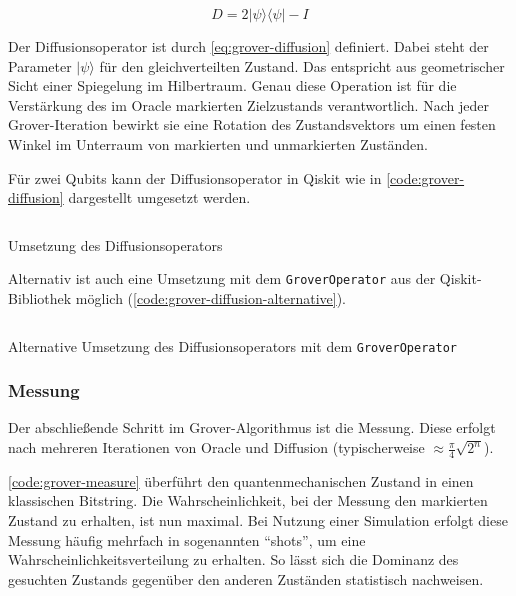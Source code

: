 \begin{equation}
\label{eq:grover-diffusion}
D = 2|\psi\rangle\langle\psi| - I
\end{equation}

Der Diffusionsoperator ist durch \autoref{eq:grover-diffusion} definiert. Dabei steht der Parameter $|\psi\rangle$ für den gleichverteilten Zustand. Das entspricht aus geometrischer Sicht einer Spiegelung im Hilbertraum. Genau diese Operation ist für die Verstärkung des im Oracle markierten Zielzustands verantwortlich. Nach jeder Grover-Iteration bewirkt sie eine Rotation des Zustandsvektors um einen festen Winkel im Unterraum von markierten und unmarkierten Zuständen. \autocite{nielsen_quantum_2010}

Für zwei Qubits kann der Diffusionsoperator in Qiskit wie in \autoref{code:grover-diffusion} dargestellt umgesetzt werden.

\begin{listing}[ht!]
  \inputminted{python}{code/grover-diffusion.py}
  \caption{Umsetzung des Diffusionsoperators}
  \label{code:grover-diffusion}
\end{listing}

Alternativ ist auch eine Umsetzung mit dem \texttt{GroverOperator} aus der Qiskit-Bibliothek möglich (\autoref{code:grover-diffusion-alternative}).

\begin{listing}[ht!]
  \inputminted{python}{code/grover-diffusion-alternative.py}
  \caption{Alternative Umsetzung des Diffusionsoperators mit dem \texttt{GroverOperator}}
  \label{code:grover-diffusion-alternative}
\end{listing}

\subsubsection*{Messung}

Der abschließende Schritt im Grover-Algorithmus ist die Messung. Diese erfolgt nach mehreren Iterationen von Oracle und Diffusion (typischerweise $\approx \frac{\pi}{4} \sqrt{2^n}$).

\autoref{code:grover-measure} überführt den quantenmechanischen Zustand in einen klassischen Bitstring. Die Wahrscheinlichkeit, bei der Messung den markierten Zustand zu erhalten, ist nun maximal. Bei Nutzung einer Simulation erfolgt diese Messung häufig mehrfach in sogenannten \enquote{shots}, um eine Wahrscheinlichkeitsverteilung zu erhalten. So lässt sich die Dominanz des gesuchten Zustands gegenüber den anderen Zuständen statistisch nachweisen.

